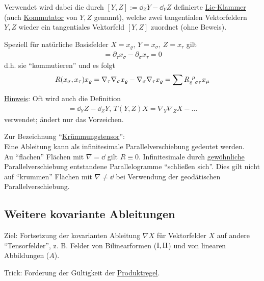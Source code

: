 Verwendet wird dabei die durch \([Y,Z] := \dd_Z Y - \dd_Y Z\) definierte \uline{Lie-Klammer} (auch \uline{Kommutator} von \(Y,Z\) genannt), welche zwei tangentialen Vektorfeldern \(Y,Z\) wieder ein tangentiales Vektorfeld \([Y,Z]\) zuordnet (ohne Beweis). \par

Speziell für natürliche Basisfelder \(X = x_\varrho, \, Y = x_\sigma, \, Z = x_\tau\) gilt
\begin{align*}
[x_\sigma, x_\tau] = \partial_\tau x_\sigma - \partial_\sigma x_\tau = 0 
\end{align*}
d.h. sie ``kommutieren'' und es folgt
\begin{align*}
 R(x_\sigma, x_\tau) x_\varrho = \nabla_\tau \nabla_\sigma x_\varrho - \nabla_\sigma \nabla_\tau x_\varrho = \sum R_{\varrho \;\, \sigma \tau}^{\;\, \mu} x_\mu
\end{align*}

\uline{Hinweis}: Oft wird auch die Definition
\begin{align*}
 [Y,Z] = \dd_Y Z - \dd_Z Y, \, T(Y,Z)X = \nabla_Y \nabla_Z X - \dots
\end{align*}
verwendet; ändert nur das Vorzeichen. \par

Zur Bezeichnung ``\uline{Krümmungstensor}'': \\
Eine Ableitung kann als infinitesimale Parallelverschiebung gedeutet werden. \\
Au ``flachen'' Flächen mit \(\nabla = \dd\) gilt \(R \equiv 0\). Infinitesimale durch \uline{gewöhnliche} Parallelverschiebung entstandene Parallelogramme ``schließen sich''. Dies gilt nicht auf ``krummen'' Flächen mit \(\nabla \ne \dd\) bei Verwendung der geodätischen Parallelverschiebung.

\subsection{Weitere kovariante Ableitungen}
Ziel: Fortsetzung der kovarianten Ableitung \(\nabla X\) für Vektorfelder \(X\) auf andere ``Tensorfelder'', z. B. Felder von Bilinearformen (\(\Rom1, \Rom2\)) und von linearen Abbildungen (\(A\)). \par
Trick: Forderung der Gültigkeit der \uline{Produktregel}.

